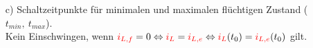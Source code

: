 {\begin{itemize}
\begin{align*}
        &= L \cdot \left( \frac{R_1}{R_2} + 1 \right) \cdot \dt\, \eci{i_L} + R_1 \cdot \eci{i_L} \qquad \bigg| \cdot \frac{1}{R_1}\\
        \frac{\ecv{u_1}}{R_1} &= \underbrace{L \cdot \left( \frac{1}{R_1} + \frac{1}{R_2} \right)}_{\ =\tau} \cdot \dt\, \eci{i_L} + \eci{i_L}\\ 
        \tau &= L \cdot \left( \frac{1}{R_1} + \frac{1}{R_2} \right) = \frac{L}{R_1||R_2}
    \end{align*}
    \item[c)] Schaltzeitpunkte für minimalen und maximalen flüchtigen Zustand ($t_{min},\ t_{max}$). \\ 
    Kein Einschwingen, wenn 
    ${\color{red}i_{L,f}}=0 \Leftrightarrow {\color{red}i_L}={\color{red}i_{L,e}} \Leftrightarrow {\color{red}i_L}(t_0)={\color{red}i_{L,e}}(t_0)$ gilt. \\
    

\end{itemize}}
